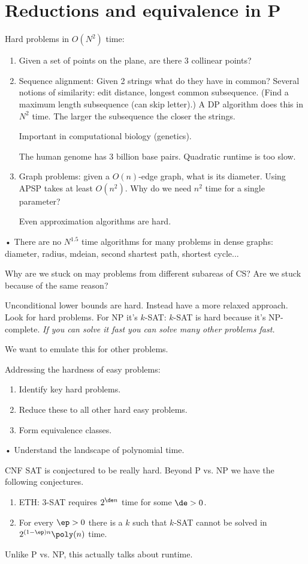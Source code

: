 \section{Reductions and equivalence in P}

Hard problems in $O(N^2)$ time:
\begin{enumerate}
\item
Given a set of points on the plane, are there 3 collinear points?
\item
Sequence alignment: Given 2 strings what do they have in common? Several notions of similarity: edit distance, longest common subsequence. (Find a maximum length subsequence (can skip letter).) A DP algorithm does this in $N^2$ time. The larger the subsequence the closer the strings.

Important in computational biology (genetics).

The human genome has 3 billion base pairs. Quadratic runtime is too slow.
\item
Graph problems: given a $O(n)$-edge graph, what is its diameter. Using APSP takes at least $O(n^2)$. Why do we need $n^2$ time for a single parameter?

Even approximation algorithms are hard.
\end{enumerate}•
There are no $N^{1.5}$ time algorithms for many problems in dense graphs: diameter, radius, mdeian, second shartest path, shortest cycle...



Why are we stuck on may problems from different subareas of CS? Are we stuck because of the same reason?

Unconditional lower bounds are hard. Instead have a more relaxed approach. Look for hard problems. For NP it's $k$-SAT: $k$-SAT is hard because it's NP-complete. \emph{If you can solve it fast you can solve many other problems fast.}

We want to emulate this for other problems. 

Addressing the hardness of easy problems:
\begin{enumerate}
\item
Identify key hard problems.
\item
Reduce these to all other hard easy problems.
\item Form equivalence classes.
\end{enumerate}•
Understand the landscape of polynomial time.

CNF SAT is conjectured to be really hard. Beyond P vs. NP we have the following conjectures.
\begin{enumerate}
\item
ETH: 3-SAT requires $2^{\de n}$ time for some $\de>0$.
\item
For every $\ep>0$ there is a $k$ such that $k$-SAT cannot be solved in $2^{(1-\ep)n}\poly(n)$ time.
\end{enumerate}
Unlike P vs. NP, this actually talks about runtime. 

